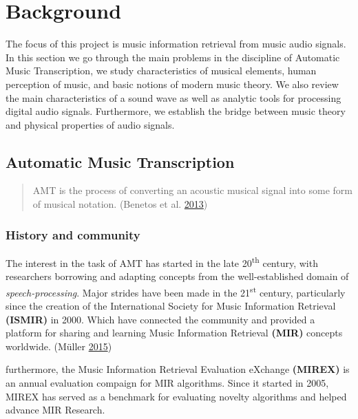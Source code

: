 \documentclass[
  american,
]{article}
\begin{document}
\pagebreak

\hypertarget{background}{%
\section{Background}\label{background}}

The focus of this project is music information retrieval
from music audio signals.
In this section we go through the main problems in
the discipline of Automatic Music Transcription,
we study characteristics of musical elements,
human perception of music, and basic notions
of modern music theory.
We also review the main characteristics of a sound wave
as well as analytic tools for processing digital audio signals.
Furthermore, we establish the bridge between music
theory and physical properties of audio signals.

\hypertarget{automatic-music-transcription}{%
\subsection{Automatic Music Transcription}\label{automatic-music-transcription}}

\begin{quote}
AMT is the process of converting an acoustic musical
signal into some form of musical notation. (Benetos et al. \protect\hyperlink{ref-benetos_2013}{2013})
\end{quote}

\hypertarget{history-and-community}{%
\subsubsection{History and community}\label{history-and-community}}

The interest in the task of AMT has started in the late
20\textsuperscript{th} century, with researchers borrowing and adapting
concepts from the well-established domain of
\emph{speech-processing}.
Major strides have been made in the 21\textsuperscript{st} century,
particularly since the creation of the International
Society for Music Information Retrieval \textbf{(ISMIR)} in 2000.
Which have connected the community and provided a platform
for sharing and learning Music Information Retrieval \textbf{(MIR)}
concepts worldwide. (Müller \protect\hyperlink{ref-muller_2015}{2015})

furthermore, the Music Information Retrieval Evaluation eXchange
\textbf{(MIREX)} is an annual evaluation compaign for MIR algorithms.
Since it started in 2005, MIREX has served as a benchmark
for evaluating novelty algorithms and helped advance
MIR Research.
\end{document}
